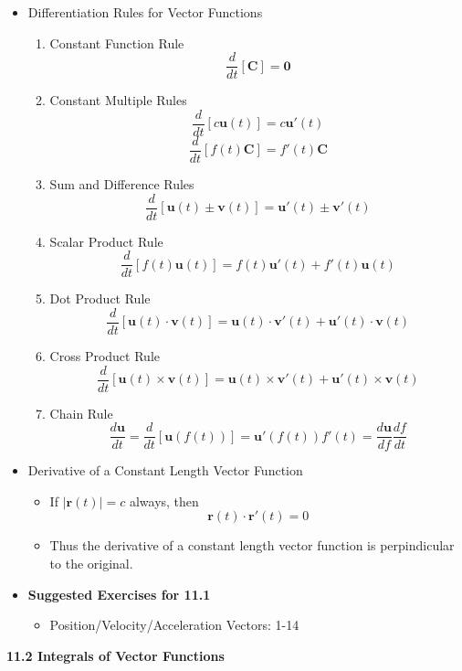 \documentclass[12pt]{article}
\renewcommand{\vec}[1]{\mathbf{#1}}
\newcommand{\<}{\left<}
\renewcommand{\>}{\right>}
\begin{document}
\begin{itemize}
  \item Differentiation Rules for Vector Functions
    \begin{enumerate}
      \item Constant Function Rule
      \[\frac{d}{dt} [\vec{C}] = \vec{0}\]
      \item Constant Multiple Rules
      \[\frac{d}{dt} [c\vec{u}(t)] = c\vec{u}'(t)\]
      \[\frac{d}{dt} [f(t)\vec{C}] = f'(t)\vec{C}\]
      \item Sum and Difference Rules
      \[\frac{d}{dt} [\vec{u}(t) \pm \vec{v}(t)] = \vec{u}'(t) \pm \vec{v}'(t)\]
      \item Scalar Product Rule
      \[\frac{d}{dt} [f(t)\vec{u}(t)] = f(t)\vec{u}'(t) + f'(t)\vec{u}(t)\]
      \item Dot Product Rule
      \[\frac{d}{dt} [\vec{u}(t) \cdot \vec{v}(t)] = \vec{u}(t)\cdot\vec{v}'(t) + \vec{u}'(t)\cdot\vec{v}(t)\]
      \item Cross Product Rule
      \[\frac{d}{dt} [\vec{u}(t) \times \vec{v}(t)] = \vec{u}(t)\times\vec{v}'(t) + \vec{u}'(t)\times\vec{v}(t)\]
      \item Chain Rule
      \[\frac{d\vec{u}}{dt} = \frac{d}{dt} [\vec{u}(f(t))] =\vec{u}'(f(t))f'(t) = \frac{d\vec{u}}{df}\frac{df}{dt}\]
    \end{enumerate}
  
  \item Derivative of a Constant Length Vector Function
    \begin{itemize}
      \item If $|\vec{r}(t)|=c$ always, then \[\vec{r}(t) \cdot \vec{r}'(t) = 0\]
      \item Thus the derivative of a constant length vector function is perpindicular to the original.
    \end{itemize}
  
  \item \textbf{Suggested Exercises for 11.1}
    \begin{itemize}
      \item Position/Velocity/Acceleration Vectors: 1-14
    \end{itemize}
\end{itemize}

\newpage

\centerline{\bf 11.2 Integrals of Vector Functions}
\end{document}
